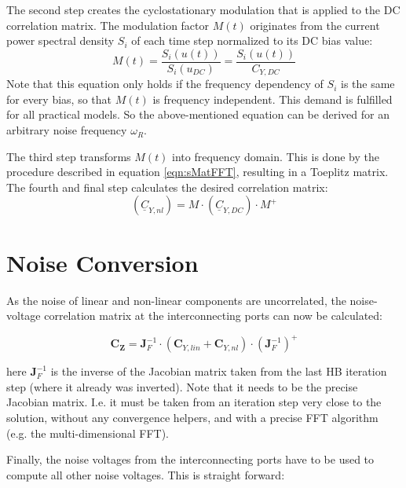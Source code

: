 \addvspace{12pt}

The second step creates the cyclostationary modulation that is applied
to the DC correlation matrix. The modulation factor $M(t)$ originates
from the current power spectral density $S_i$ of each time step
normalized to its DC bias value:
\begin{equation}
M(t) = \dfrac{S_i\left( u(t) \right)}{S_i(u_{DC})}
     = \dfrac{S_i\left( u(t) \right)}{C_{Y,DC}}
\end{equation}
Note that this equation only holds if the frequency dependency of
$S_i$ is the same for every bias, so that $M(t)$ is frequency
independent. This demand is fulfilled for all practical models.
So the above-mentioned equation can be derived for an arbitrary
noise frequency $\omega_R$.

\addvspace{12pt}

The third step transforms $M(t)$ into frequency domain. This is done
by the procedure described in equation \ref{eqn:sMatFFT}, resulting
in a Toeplitz matrix.\\
The fourth and final step calculates the desired correlation matrix:
\begin{equation}
(\underline{C}_{Y,nl}) = M \cdot (\underline{C}_{Y,DC}) \cdot M^+
\end{equation}


\section{Noise Conversion}

As the noise of linear and non-linear components are uncorrelated,
the noise-voltage correlation matrix at the interconnecting ports
can now be calculated:

\begin{equation}
\boldsymbol{C_Z} = \boldsymbol{J}_F^{-1} \cdot (\boldsymbol{C}_{Y,lin} + \boldsymbol{C}_{Y,nl})
       \cdot (\boldsymbol{J}_F^{-1})^+
\end{equation}

here $\boldsymbol{J}_F^{-1}$ is the inverse of the Jacobian matrix taken
from the last HB iteration step (where it already was inverted). Note
that it needs to be the precise Jacobian matrix. I.e. it must be taken
from an iteration step very close to the solution, without any convergence
helpers, and with a precise FFT algorithm (e.g. the multi-dimensional FFT).

\addvspace{12pt}

Finally, the noise voltages from the interconnecting ports have to be used
to compute all other noise voltages. This is straight forward:

